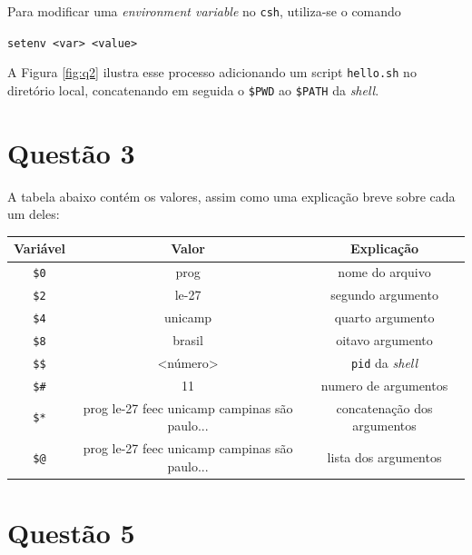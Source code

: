 \documentclass{article}
\begin{document}
Para modificar uma \textit{environment variable} no \texttt{csh}, utiliza-se o comando

\begin{center}
    \texttt{setenv <var> <value>}
\end{center}

A Figura \ref*{fig:q2}
ilustra esse processo adicionando um script \texttt{hello.sh} no diretório local, concatenando em seguida o \texttt{\$PWD} ao \texttt{\$PATH} da \textit{shell}.

\FloatBarrier

\section*{Questão 3}

A tabela abaixo contém os valores, assim como uma explicação breve sobre cada um deles:

\begin{center}
    \begin{tabular}{|c|c|c|}
        \hline
        \textbf{Variável} & \textbf{Valor} & \textbf{Explicação} \\
        \hline
        \texttt{\$0} & prog & nome do arquivo \\
        \hline
        \texttt{\$2} & le-27 & segundo argumento \\
        \hline
        \texttt{\$4} & unicamp & quarto argumento \\
        \hline
        \texttt{\$8} & brasil & oitavo argumento \\
        \hline
        \texttt{\$\$} & <número> & \texttt{pid} da \textit{shell} \\
        \hline
        \texttt{\$\#} & 11 & numero de argumentos \\
        \hline
        \texttt{\$*} & prog le-27 feec unicamp campinas são paulo... & concatenação dos argumentos \\
        \hline
        \texttt{\$@} & prog le-27 feec unicamp campinas são paulo... & lista dos argumentos \\
        \hline
        
    \end{tabular}
\end{center}

\section*{Questão 5}
\end{document}
